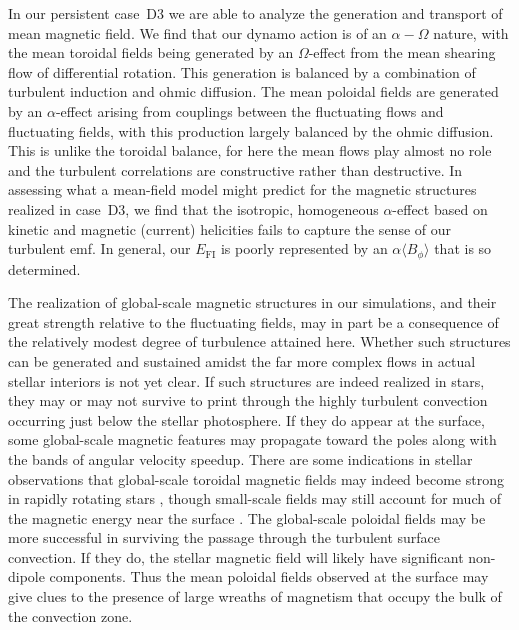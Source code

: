 In our persistent case~D3 we are able to analyze the generation and
transport of mean magnetic field.  We find that our dynamo action is
of an $\alpha-\Omega$ nature, with the mean toroidal fields being
generated by an $\Omega$-effect from the mean shearing flow of
differential rotation.  This generation is balanced by a combination
of turbulent induction and ohmic diffusion.  The mean poloidal fields
are generated by an $\alpha$-effect arising from couplings between the
fluctuating flows and fluctuating fields, with this production largely
balanced by the ohmic diffusion.  This is unlike the toroidal balance,
for here the mean flows play almost no role and the turbulent
correlations are constructive rather than destructive.  In assessing
what a mean-field model might predict for the magnetic structures
realized in case~D3, we find that the isotropic, homogeneous $\alpha$-effect based on kinetic
and magnetic (current) helicities fails to capture the sense of our turbulent
emf.  In general, our $E_\mathrm{FI}$ is poorly represented by an $\alpha
\langle B_\phi \rangle$ that is so determined.



The realization of global-scale magnetic structures in
our simulations, and their great strength relative to the fluctuating
fields, may in part be a consequence of the relatively modest degree
of turbulence attained here.  Whether such structures can be generated
and sustained amidst the far more complex flows in actual stellar
interiors is not yet clear.  If such structures are indeed realized in
stars, they may or may not survive to print
through the highly turbulent convection occurring just below the stellar
photosphere.  If they do appear at the surface, some global-scale
magnetic features may propagate toward the poles along with the bands
of angular velocity speedup.   
There are some indications in stellar observations that
global-scale toroidal magnetic fields may indeed become strong in rapidly
rotating stars \citep{Donati_et_al_2006, Petit_et_al_2008}, though
small-scale fields may still account for much of the magnetic energy
near the surface \citep{Reiners&Basri_2009}.
The global-scale poloidal fields may be more successful in surviving
the passage through the turbulent surface convection.  If they do, the
stellar magnetic field will likely have significant non-dipole components.
Thus the mean poloidal fields observed at the surface may give clues to
the presence of large wreaths of magnetism that occupy the bulk of
the convection zone. 



